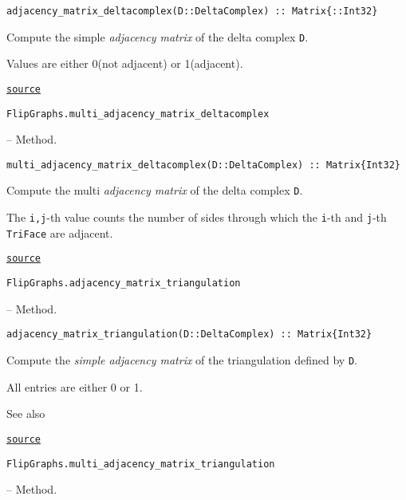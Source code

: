 \begin{adjustwidth}{2em}{0pt}


\begin{verbatim}
adjacency_matrix_deltacomplex(D::DeltaComplex) :: Matrix{::Int32}
\end{verbatim}

Compute the simple \emph{adjacency matrix} of the delta complex \texttt{D}.

Values are either 0(not adjacent) or 1(adjacent).



\href{https://github.com/schto223/FlipGraphs.jl/blob/490c01a7adf74b42f27dda05099165c47ae8133e/src/deltaComplex.jl#L407-L413}{\texttt{source}}


\end{adjustwidth}
\hypertarget{3047080931709895726}{\texttt{FlipGraphs.multi\_adjacency\_matrix\_deltacomplex}}  -- {Method.}

\begin{adjustwidth}{2em}{0pt}


\begin{verbatim}
multi_adjacency_matrix_deltacomplex(D::DeltaComplex) :: Matrix{Int32}
\end{verbatim}

Compute the multi \emph{adjacency matrix} of the delta complex \texttt{D}.

The \texttt{i,j}-th value counts the number of sides through which the \texttt{i}-th and \texttt{j}-th \texttt{TriFace} are adjacent.



\href{https://github.com/schto223/FlipGraphs.jl/blob/490c01a7adf74b42f27dda05099165c47ae8133e/src/deltaComplex.jl#L432-L438}{\texttt{source}}


\end{adjustwidth}
\hypertarget{10856297191220049265}{\texttt{FlipGraphs.adjacency\_matrix\_triangulation}}  -- {Method.}

\begin{adjustwidth}{2em}{0pt}


\begin{verbatim}
adjacency_matrix_triangulation(D::DeltaComplex) :: Matrix{Int32}
\end{verbatim}

Compute the \emph{simple adjacency matrix} of the triangulation defined by \texttt{D}.

All entries are either 0 or 1.

See also 



\href{https://github.com/schto223/FlipGraphs.jl/blob/490c01a7adf74b42f27dda05099165c47ae8133e/src/deltaComplex.jl#L445-L453}{\texttt{source}}


\end{adjustwidth}
\hypertarget{9319800104016369462}{\texttt{FlipGraphs.multi\_adjacency\_matrix\_triangulation}}  -- {Method.}


